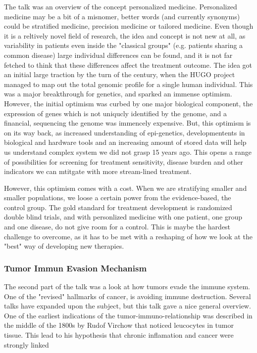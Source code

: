 \documentclass[12p]{article}
\begin{document}
The talk was an overview of the concept personalized medicine.
Personalized medicine may be a bit of a misnomer, better words (and currently synonyms) could be stratified medicine, precision medicine or tailored medicine.
Even though it is a reltively novel field of research, the idea and concept is not new at all, as variability in patients even inside the "classical groups" (e.g. patients sharing a common disease) large individual differences can be found, and it is not far fetched to think that these differences affect the treatment outcome.
The idea got an initial large traction by the turn of the century, when the HUGO project managed to map out the total genomic profile for a single human individual.
This was a major breakthrough for genetics, and sparked an immense optimism.
However, the initial optimism was curbed by one major biological component, the expression of genes which is not uniqucly identified by the genome, and a financial, sequencing the genome was immencely expensive.
But, this optimism is on its way back, as increased understanding of epi-genetics, developmentents in biological and hardware tools and an increasing amount of stored data will help us understand complex system we did not grasp 15 years ago.
This opens a range of possibilities for screening for treatment sensitivity, disease burden and other indicators we can mtitgate with more stream-lined treatment.

However, this optimism comes with a cost.
When we are stratifying smaller and smaller populations, we loose a certain power from the evidence-based, the control group.
The gold standard for treatment development is randomized double blind trials, and with personlized medicine with one patient, one group and one disease, do not give room for a control.
This is maybe the hardest challenge to overcome, as it has to be met with a reshaping of how we look at the "best" way of developing new therapies.

\subsubsection{Tumor Immun Evasion Mechanism}

The second part of the talk was a look at how tumors evade the immune system.
One of the "revised" hallmarks of cancer, is avoiding immune destruction.
Several talks have expanded upon the subject, but this talk gave a nice general overview.
One of the earliest indications of the tumor-immuno-relationship was described in the middle of the 1800s by Rudof Virchow that noticed leucocytes in tumor tissue.
This lead to his hypothesis that chronic inflamation and cancer were strongly linked 
\end{document}

